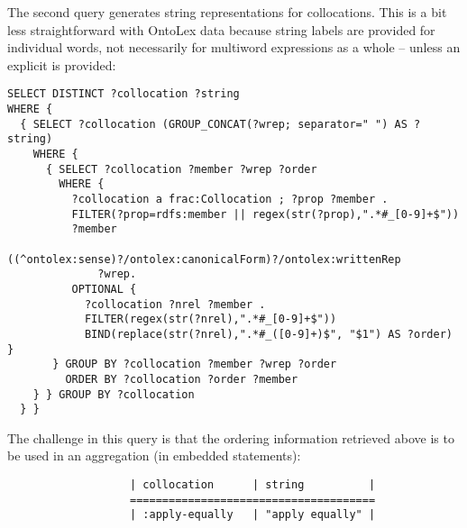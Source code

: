 

\noindent
The second query generates string representations for collocations.
This is a bit less straightforward with OntoLex data because string labels are provided for individual words, not necessarily for multiword expressions as a whole -- unless an explicit  is provided:

{\listingsize
\begin{verbatim}
SELECT DISTINCT ?collocation ?string
WHERE {
  { SELECT ?collocation (GROUP_CONCAT(?wrep; separator=" ") AS ?string)
    WHERE {
      { SELECT ?collocation ?member ?wrep ?order 
        WHERE {
          ?collocation a frac:Collocation ; ?prop ?member .
          FILTER(?prop=rdfs:member || regex(str(?prop),".*#_[0-9]+$"))
          ?member 
            ((^ontolex:sense)?/ontolex:canonicalForm)?/ontolex:writtenRep 
              ?wrep.
          OPTIONAL {
            ?collocation ?nrel ?member .
            FILTER(regex(str(?nrel),".*#_[0-9]+$"))
            BIND(replace(str(?nrel),".*#_([0-9]+)$", "$1") AS ?order) }
       } GROUP BY ?collocation ?member ?wrep ?order
         ORDER BY ?collocation ?order ?member
    } } GROUP BY ?collocation
  } }
\end{verbatim}
}

\noindent
    The challenge in this query is that the ordering information retrieved above is to be used in an aggregation 
(in embedded  statements):

{\listingsize
\begin{verbatim}
                   | collocation      | string          |
                   ======================================
                   | :apply-equally   | "apply equally" |
\end{verbatim}
}


